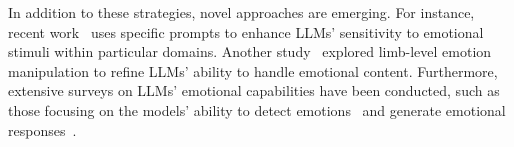 In addition to these strategies, novel approaches are emerging. For instance, recent work~\cite{li2023large} uses specific prompts to enhance LLMs' sensitivity to emotional stimuli within particular domains. Another study~\cite{Yu2024} explored limb-level emotion manipulation to refine LLMs' ability to handle emotional content. Furthermore, extensive surveys on LLMs’ emotional capabilities have been conducted, such as those focusing on the models' ability to detect emotions~\cite{Dudy2024AnalyzingCR} and generate emotional responses~\cite{Miao2023TowardsEG}.



